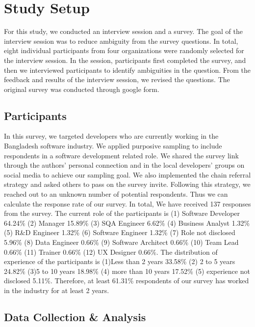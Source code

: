 \section{Study Setup}
\label{study_setup}
For this study, we conducted an interview session and a survey. The goal of the interview session was to reduce ambiguity from the survey questions. In total, eight individual participants from four organizations were randomly selected for the interview session. In the session, participants first completed the survey, and then we interviewed participants to identify ambiguities in the question. From the feedback and results of the interview session, we revised the questions. The original survey was conducted through google form.

\subsection{Participants}
\label{survey_participants}
In this survey, we targeted developers who are currently working in the Bangladesh software industry. We applied purposive sampling\cite{Vogt2005} to include respondents in a software development related role. We shared the survey link through the authors' personal connection and in the local developers' groups on social media to achieve our sampling goal. We also implemented the chain referral strategy\cite{creswell2013} and asked others to pass on the survey invite. Following this strategy, we reached out to an unknown number of potential respondents. Thus we can calculate the response rate of our survey. In total, We have received 137 responses from the survey. The current role of the participants is (1) Software Developer 64.24\% (2) Manager 15.89\% (3) SQA Engineer 6.62\% (4) Business Analyst 1.32\% (5) R\&D Engineer 1.32\% (6) Software Engineer 1.32\% (7) Role not disclosed 5.96\% (8) Data Engineer 0.66\% (9) Software Architect 0.66\% (10) Team Lead 0.66\% (11) Trainer 0.66\% (12) UX Designer 0.66\%. The distribution of experience of the participants is (1)Less than 2 years 33.58\% (2) 2 to 5 years 24.82\% (3)5 to 10 years 18.98\% (4) more than 10 years 17.52\% (5) experience not disclosed 5.11\%. Therefore, at least 61.31\% respondents of our survey has worked in the industry for at least 2 years.



\subsection{Data Collection \& Analysis}
\label{survey_data_collection}

